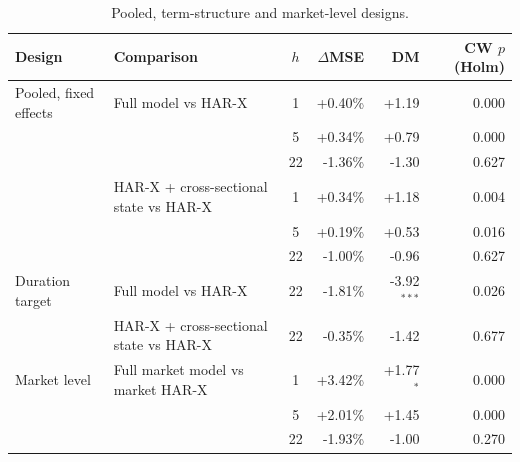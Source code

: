 \begin{table}[H]
\caption{Pooled, term-structure and market-level designs.}
\label{tab:designs}
\footnotesize
\begin{tabularx}{\textwidth}{lXcrrr}
\toprule
Design & Comparison & $h$ & $\Delta$MSE & DM & CW $p$ (Holm) \\
\midrule
Pooled, fixed effects & Full model vs HAR-X & 1 & +0.40\% & +1.19 & 0.000 \\
 &  & 5 & +0.34\% & +0.79 & 0.000 \\
 &  & 22 & -1.36\% & -1.30 & 0.627 \\
 & HAR-X + cross-sectional state vs HAR-X & 1 & +0.34\% & +1.18 & 0.004 \\
 &  & 5 & +0.19\% & +0.53 & 0.016 \\
 &  & 22 & -1.00\% & -0.96 & 0.627 \\
\midrule
Duration target & Full model vs HAR-X & 22 & -1.81\% & -3.92$^{***}$ & 0.026 \\
 & HAR-X + cross-sectional state vs HAR-X & 22 & -0.35\% & -1.42 & 0.677 \\
\midrule
Market level & Full market model vs market HAR-X & 1 & +3.42\% & +1.77$^{*}$ & 0.000 \\
 &  & 5 & +2.01\% & +1.45 & 0.000 \\
 &  & 22 & -1.93\% & -1.00 & 0.270 \\
\bottomrule
\end{tabularx}
\end{table}

